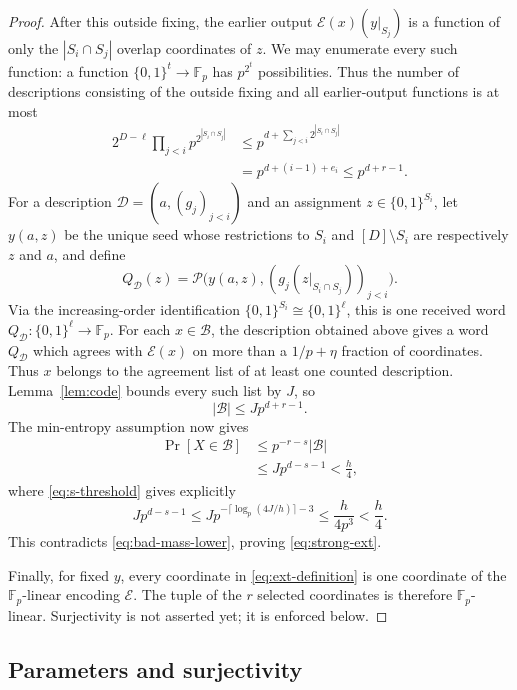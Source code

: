 \documentclass[11pt]{article}
\numberwithin{equation}{section}
\theoremstyle{definition}
\theoremstyle{remark}
\newcommand{\F}{\mathbb F}
\begin{document}
\begin{proof}
After this outside fixing, the earlier output
$\mathcal E(x)(y|_{S_j})$ is a function of only the
$|S_i\cap S_j|$ overlap coordinates of $z$.  We may enumerate every such
function: a function $\{0,1\}^t\to\F_p$ has $p^{2^t}$ possibilities.  Thus
the number of descriptions consisting of the outside fixing and all
earlier-output functions is at most
\begin{align*}
 2^{D-\ell}\prod_{j<i}p^{2^{|S_i\cap S_j|}}
 &\le p^{d+\sum_{j<i}2^{|S_i\cap S_j|}}\\
 &=p^{d+(i-1)+e_i}
 \le p^{d+r-1}.
\end{align*}
For a description $\mathcal D=(a,(g_j)_{j<i})$ and an assignment
$z\in\{0,1\}^{S_i}$, let $y(a,z)$ be the unique seed whose restrictions to
$S_i$ and $[D]\setminus S_i$ are respectively $z$ and $a$, and define
\[
 Q_{\mathcal D}(z)=\mathcal P\bigl(
 y(a,z),(g_j(z|_{S_i\cap S_j}))_{j<i}\bigr).
\]
Via the increasing-order identification
$\{0,1\}^{S_i}\cong\{0,1\}^\ell$, this is one received word
$Q_{\mathcal D}:\{0,1\}^\ell\to\F_p$.  For each
$x\in\mathcal B$, the description obtained above gives a word $Q_{\mathcal D}$
which agrees with $\mathcal E(x)$ on more than a $1/p+\eta$ fraction of
coordinates.  Thus $x$ belongs to the agreement list of at least one
counted description.  Lemma~\ref{lem:code} bounds every such list by
$J$, so
\[
 |\mathcal B|\le Jp^{d+r-1}.
\]
The min-entropy assumption now gives
\begin{align*}
 \Pr[X\in\mathcal B]
 &\le p^{-r-s}|\mathcal B|\\
 &\le Jp^{d-s-1}<\frac h4,
\end{align*}
where \eqref{eq:s-threshold} gives explicitly
\[
 Jp^{d-s-1}
 \le Jp^{-\lceil\log_p(4J/h)\rceil-3}
 \le\frac{h}{4p^3}<\frac h4.
\]
This
contradicts \eqref{eq:bad-mass-lower}, proving \eqref{eq:strong-ext}.

Finally, for fixed $y$, every coordinate in \eqref{eq:ext-definition} is
one coordinate of the $\F_p$-linear encoding $\mathcal E$.  The tuple of
the $r$ selected coordinates is therefore $\F_p$-linear.  Surjectivity is
not asserted yet; it is enforced below.
\end{proof}

\subsection{Parameters and surjectivity}
\end{document}
